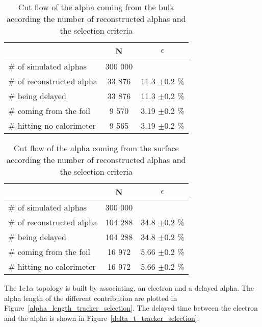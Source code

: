 \documentclass[main.tex]{subfiles}
\begin{document}
\begin{table}[h!]
\begin{center}
\begin{tabular}{l|c|c}
 & N & $\epsilon$ \\
\toprule
$\#$ of simulated alphas & 300 000 & \\
\hline
$\#$ of reconstructed alpha & 33 876 & 11.3 $ \pm 0.2$ \%\\
$\#$ being delayed          & 33 876 & 11.3 $ \pm 0.2$ \%\\
$\#$ coming from the foil   & 9 570  & 3.19 $ \pm 0.2$ \%\\
$\#$ hitting no calorimeter & 9 565  & 3.19 $ \pm 0.2$ \%\\
\bottomrule
\end{tabular}
\end{center}
\caption{Cut flow of the alpha coming from the bulk according the number of reconstructed alphas and the selection criteria}
\label{Cutflowalphatrackerbulk}
\end{table}


\begin{table}[h!]
\begin{center}
\begin{tabular}{l|c|c}
 & N & $\epsilon$ \\
\toprule
$\#$ of simulated alphas & 300 000 & \\
\hline
$\#$ of reconstructed alpha & 104 288 & 34.8 $ \pm $0.2 \%\\
$\#$ being delayed          & 104 288 & 34.8 $ \pm $0.2 \%\\
$\#$ coming from the foil   & 16 972  & 5.66 $ \pm $0.2 \%\\
$\#$ hitting no calorimeter & 16 972  & 5.66 $ \pm $0.2 \%\\
\bottomrule
\end{tabular}
\end{center}
\caption{Cut flow of the alpha coming from the surface according the number of reconstructed alphas and the selection criteria}
\label{Cutflowalphatrackersurface}
\end{table}


\bigskip


\noindent The 1e1$\alpha$ topology is built by associating, an electron and a delayed alpha. The alpha length of the different contribution are plotted in Figure~\ref{alpha_length_tracker_selection}. The delayed time between the electron and the alpha is shown in Figure~\ref{delta_t_tracker_selection}.
\end{document}

